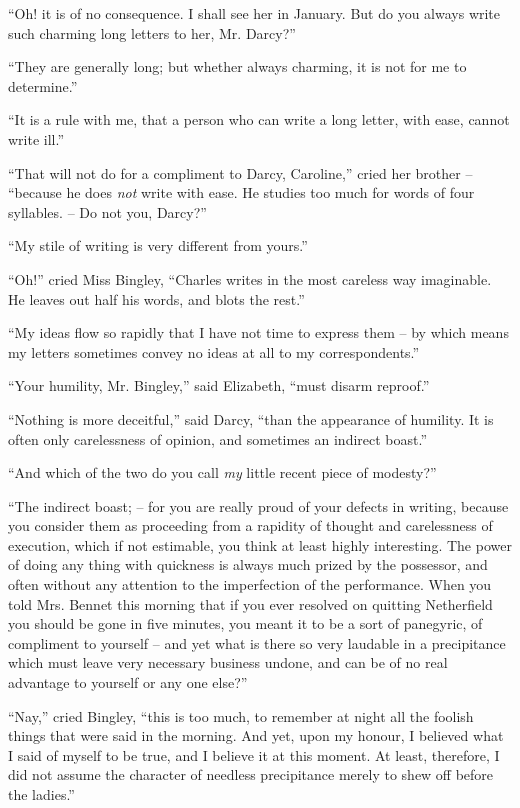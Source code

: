 “Oh! it is of no consequence. I shall see her in January.
But do you always write such charming long letters to
her, Mr. Darcy?”

“They are generally long; but whether always
charming, it is not for me to determine.”

“It is a rule with me, that a person who can write
a long letter, with ease, cannot write ill.”

“That will not do for a compliment to Darcy, Caroline,”
cried her brother -- “because he does \textit{not} write with ease.
He studies too much for words of four syllables. -- Do not
you, Darcy?”

“My stile of writing is very different from yours.”

“Oh!” cried Miss Bingley, “Charles writes in the most
careless way imaginable. He leaves out half his words,
and blots the rest.”

“My ideas flow so rapidly that I have not time to
express them -- by which means my letters sometimes
convey no ideas at all to my correspondents.”

“Your humility, Mr. Bingley,” said Elizabeth, “must
disarm reproof.”

“Nothing is more deceitful,” said Darcy, “than the
appearance of humility. It is often only carelessness of
opinion, and sometimes an indirect boast.”

“And which of the two do you call \textit{my} little recent
piece of modesty?”

“The indirect boast; -- for you are really proud of your
defects in writing, because you consider them as proceeding
from a rapidity of thought and carelessness of
execution, which if not estimable, you think at least
highly interesting. The power of doing any thing with
quickness is always much prized by the possessor, and
often without any attention to the imperfection of the
performance. When you told Mrs. Bennet this morning
that if you ever resolved on quitting Netherfield you
should be gone in five minutes, you meant it to be a sort
of panegyric, of compliment to yourself -- and yet what
is there so very laudable in a precipitance which must
leave very necessary business undone, and can be of no real
advantage to yourself or any one else?”

“Nay,” cried Bingley, “this is too much, to remember
at night all the foolish things that were said in the morning.
And yet, upon my honour, I believed what I said of myself
to be true, and I believe it at this moment. At least,
therefore, I did not assume the character of needless
precipitance merely to shew off before the ladies.”

